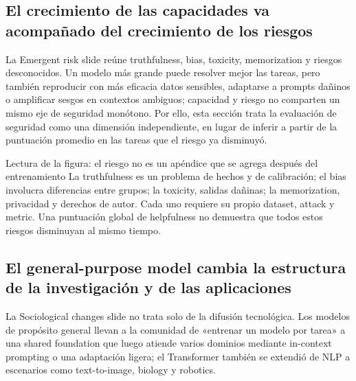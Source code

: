 \subsection{El crecimiento de las capacidades va acompañado del crecimiento de los riesgos}

La Emergent risk slide reúne truthfulness, bias, toxicity, memorization y riesgos desconocidos. Un modelo más grande puede resolver mejor las tareas, pero también reproducir con más eficacia datos sensibles, adaptarse a prompts dañinos o amplificar sesgos en contextos ambiguos; capacidad y riesgo no comparten un mismo eje de seguridad monótono. Por ello, esta sección trata la evaluación de seguridad como una dimensión independiente, en lugar de inferir a partir de la puntuación promedio en las tareas que el riesgo ya disminuyó.


\begin{knowledgebox}{Lectura de la figura: el riesgo no es un apéndice que se agrega después del entrenamiento}
La truthfulness es un problema de hechos y de calibración; el bias involucra diferencias entre grupos; la toxicity, salidas dañinas; la memorization, privacidad y derechos de autor. Cada uno requiere su propio dataset, attack y metric. Una puntuación global de helpfulness no demuestra que todos estos riesgos disminuyan al mismo tiempo.
\end{knowledgebox}


\subsection{El general-purpose model cambia la estructura de la investigación y de las aplicaciones}

La Sociological changes slide no trata solo de la difusión tecnológica. Los modelos de propósito general llevan a la comunidad de «entrenar un modelo por tarea» a una shared foundation que luego atiende varios dominios mediante in-context prompting o una adaptación ligera; el Transformer también se extendió de NLP a escenarios como text-to-image, biology y robotics.

